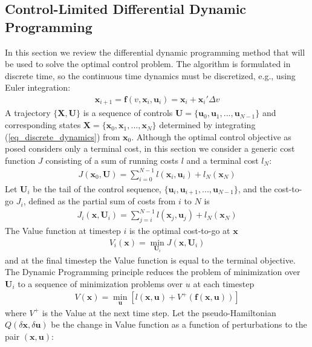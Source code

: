 \documentclass[journal ]{new-aiaa}
\newcommand{\state}{\ensuremath{\mathbf{x}}}
\newcommand{\control}{\ensuremath{\mathbf{u}}}
\newcommand{\State}{\ensuremath{\mathbf{X}}}
\newcommand{\Control}{\ensuremath{\mathbf{U}}}
\begin{document}
\subsection*{Control-Limited Differential Dynamic Programming}
In this section we review the differential dynamic programming method that will be used to solve the optimal control problem. 
The algorithm is formulated in discrete time, so the continuous time dynamics must be discretized, e.g., using Euler integration:
\begin{align}
\state_{i+1} = \mathbf{f}(v, \state_i,\control_i) = \state_i + \state_i'\Delta v \label{eq_discrete_dynamics}
\end{align}
A trajectory $\{\State,\Control\}$ is a sequence of controls $ \Control=\{\control_0,\control_1,...,\control_{N-1}\} $ and corresponding states $\State=\{\state_0,\state_1,...,\state_N\}$ determined by integrating (\ref{eq_discrete_dynamics}) from $\state_0$.
Although the optimal control objective as posed considers only a terminal cost, in this section we consider a generic cost function $J$ consisting of a sum of running costs $l$ and a terminal cost $l_N$:
\begin{align}
J(\state_0,\Control) = \sum_{i=0}^{N-1}l(\state_i,\control_i) + l_N(\state_N)
\end{align}
Let $\Control_i$ be the tail of the control sequence, $\{\control_i,\control_{i+1},...,\control_{N-1}\}$, and the cost-to-go $J_i$, defined as the partial sum of costs from $i$ to $N$ is
\begin{align}
J_i(\state,\Control_i) = \sum_{j=i}^{N-1}l(\state_j,\control_j) + l_N(\state_N)
\end{align}
The Value function at timestep $i$ is the optimal cost-to-go at \state
\begin{align}
V_i(\state) = \min_{\Control_i} J(\state, \Control_i)
\end{align}
and at the final timestep the Value function is equal to the terminal objective. The Dynamic Programming principle reduces the problem of minimization over $\Control_i$ to a sequence of minimization problems over $u$ at each timestep 
\begin{align}
V(\state) = \min_{\control}\left[l(\state,\control) + V^+(\mathbf{f}(\state,\control))\right] \label{eq_dynamic_programming}
\end{align}
where $V^+$ is the Value at the next time step.
Let the pseudo-Hamiltonian $Q(\delta\state,\delta\control)$ be the change in Value function as a function of perturbations to the pair $(\state,\control)$:
\end{document}
